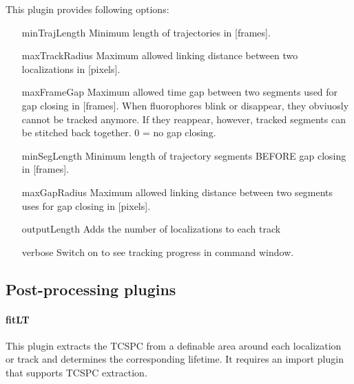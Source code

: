 \documentclass[11pt,onside]{report}
\numberwithin{equation}{chapter}
\begin{document}
This plugin provides following options:
\begin{itemize}[leftmargin=3cm]
	\item[\textsf{minTrajLength}] Minimum length of trajectories in [frames].
	\item[\textsf{maxTrackRadius}] Maximum allowed linking distance between two localizations in [pixels].
	\item[\textsf{maxFrameGap}] Maximum allowed time gap between two segments used for gap closing in [frames]. When fluorophores blink or disappear, they obviuosly cannot be tracked anymore. If they reappear, however, tracked segments can be stitched back together. 0 = no gap closing.
	\item[\textsf{minSegLength}] Minimum length of trajectory segments BEFORE gap closing in [frames].
	\item[\textsf{maxGapRadius}] Maximum allowed linking distance between two segments uses for gap closing in [pixels].
	\item[\textsf{outputLength}] Adds the number of localizations to each track
	\item[\textsf{verbose}] Switch on to see tracking progress in command window.
\end{itemize}
\subsection{Post-processing plugins}
\paragraph{fitLT}
This plugin extracts the TCSPC from a definable area around each localization or track and determines the corresponding lifetime. It requires an import plugin that supports TCSPC extraction.
\end{document}
